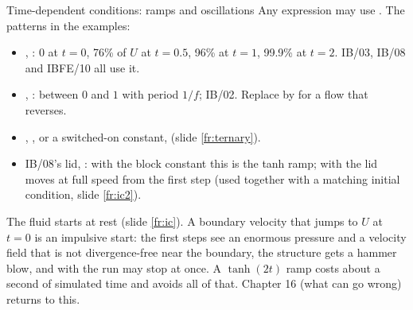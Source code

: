 \documentclass[aspectratio=169,11pt]{beamer}
\begin{document}
\begin{frame}{Time-dependent conditions: ramps and oscillations}
\label{fr:time}
\small Any expression may use . The patterns in the examples:
\begin{itemize}
  \item {}, : $0$ at $t = 0$, 76\% of $U$ at $t = 0.5$, 96\% at $t = 1$, 99.9\% at $t = 2$. IB/03, IB/08 and IBFE/10 all use it.
  \item {}, : between $0$ and $1$ with period $1/f$; IB/02. Replace by  for a flow that reverses.
  \item {}, , or a switched-on constant,  (slide \ref{fr:ternary}).
  \item IB/08's lid, : with the block constant  this is the tanh ramp; with  the lid moves at full speed from the first step (used together with a matching initial condition, slide \ref{fr:ic2}).
\end{itemize}
\vspace{1mm}
\begin{punchbox}
\small {} The fluid starts at rest (slide \ref{fr:ic}). A boundary velocity that jumps to $U$ at $t = 0$ is an impulsive start: the first steps see an enormous pressure and a velocity field that is not divergence-free near the boundary, the structure gets a hammer blow, and with  the run may stop at once. A $\tanh(2t)$ ramp costs about a second of simulated time and avoids all of that. Chapter 16 (what can go wrong) returns to this.
\end{punchbox}
\end{frame}
\end{document}
